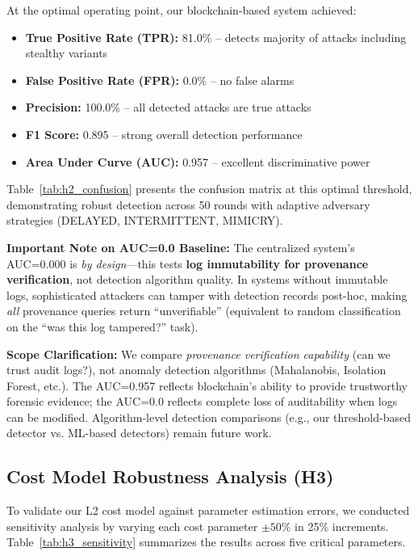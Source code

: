 \documentclass[12pt,a4paper,onecolumn]{article}
\begin{document}
At the optimal operating point, our blockchain-based system achieved:
\begin{itemize}
    \item \textbf{True Positive Rate (TPR):} 81.0\% -- detects majority of attacks including stealthy variants
    \item \textbf{False Positive Rate (FPR):} 0.0\% -- no false alarms
    \item \textbf{Precision:} 100.0\% -- all detected attacks are true attacks
    \item \textbf{F1 Score:} 0.895 -- strong overall detection performance
    \item \textbf{Area Under Curve (AUC):} 0.957 -- excellent discriminative power
\end{itemize}

Table~\ref{tab:h2_confusion} presents the confusion matrix at this optimal threshold, demonstrating robust detection across 50 rounds with adaptive adversary strategies (DELAYED, INTERMITTENT, MIMICRY).



\textbf{Important Note on AUC=0.0 Baseline:} The centralized system's AUC=0.000 is \emph{by design}---this tests \textbf{log immutability for provenance verification}, not detection algorithm quality. In systems without immutable logs, sophisticated attackers can tamper with detection records post-hoc, making \emph{all} provenance queries return ``unverifiable'' (equivalent to random classification on the ``was this log tampered?'' task).

\textbf{Scope Clarification:} We compare \emph{provenance verification capability} (can we trust audit logs?), not anomaly detection algorithms (Mahalanobis, Isolation Forest, etc.). The AUC=0.957 reflects blockchain's ability to provide trustworthy forensic evidence; the AUC=0.0 reflects complete loss of auditability when logs can be modified. Algorithm-level detection comparisons (e.g., our threshold-based detector vs. ML-based detectors) remain future work.

\subsection{Cost Model Robustness Analysis (H3)}

To validate our L2 cost model against parameter estimation errors, we conducted sensitivity analysis by varying each cost parameter $\pm 50\%$ in 25\% increments. Table~\ref{tab:h3_sensitivity} summarizes the results across five critical parameters.
\end{document}

